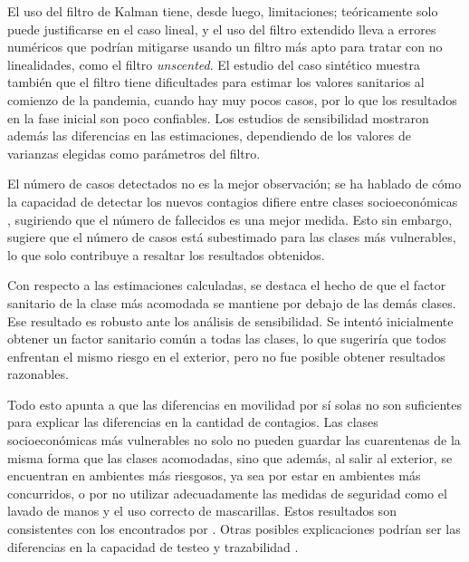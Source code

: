
El uso del filtro de Kalman tiene, desde luego, limitaciones; teóricamente solo puede justificarse en el caso lineal, y el uso del filtro extendido lleva a errores numéricos que podrían mitigarse usando un filtro más apto para tratar con no linealidades, como el filtro \textit{unscented}. El estudio del caso sintético muestra también que el filtro tiene dificultades para estimar los valores sanitarios al comienzo de la pandemia, cuando hay muy pocos casos, por lo que los resultados en la fase inicial son poco confiables. Los estudios de sensibilidad mostraron además las diferencias en las estimaciones, dependiendo de los valores de varianzas elegidas como parámetros del filtro.

El número de casos detectados no es la mejor observación; se ha hablado de cómo la capacidad de detectar los nuevos contagios difiere entre clases socioeconómicas \cite{Mena2021}, sugiriendo que el número de fallecidos es una mejor medida. Esto sin embargo, sugiere que el número de casos está subestimado para las clases más vulnerables, lo que solo contribuye a resaltar los resultados obtenidos.

Con respecto a las estimaciones calculadas, se destaca el hecho de que el factor sanitario de la clase más acomodada se mantiene por debajo de las demás clases. Ese resultado es robusto ante los análisis de sensibilidad. Se intentó inicialmente obtener un factor sanitario común a todas las clases, lo que sugeriría que todos enfrentan el mismo riesgo en el exterior, pero no fue posible obtener resultados razonables.

Todo esto apunta a que las diferencias en movilidad por sí solas no son suficientes para explicar las diferencias en la cantidad de contagios. Las clases socioeconómicas más vulnerables no solo no pueden guardar las cuarentenas de la misma forma que las clases acomodadas, sino que además, al salir al exterior, se encuentran en ambientes más riesgosos, ya sea por estar en ambientes más concurridos, o por no utilizar adecuadamente las medidas de seguridad como el lavado de manos y el uso correcto de mascarillas. Estos resultados son consistentes con los encontrados por \cite{Chang2021}. Otras posibles explicaciones podrían ser las diferencias en la capacidad de testeo y trazabilidad \cite{Bennett2021}\cite{Mena2021}.

